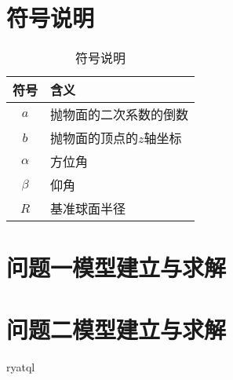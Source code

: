 \documentclass[withoutpreface,bwprint]{cumcmthesis} %
\begin{document}
\section{符号说明}
\begin{table}[H] %
    \begin{center} %
    \caption{符号说明} %
    \begin{tabular}{cl} %
        \toprule %
        \multicolumn{1}{m{3cm}}{\centering 符号} %
        & \multicolumn{1}{m{10cm}}{ 含义} %
        \\ %
        \midrule %
        $a$	&抛物面的二次系数的倒数\\
        $b$	&抛物面的顶点的$z$轴坐标\\
        $\alpha$	&方位角\\
        $\beta$	&仰角\\
        $R$	&基准球面半径\\
         \bottomrule
        \end{tabular} \label{tb:符号说明}%
    \end{center} %
\end{table} %


\section{问题一模型建立与求解}





\section{问题二模型建立与求解}




\begin{appendices}
ryatql
 
\end{appendices}
\end{document}

